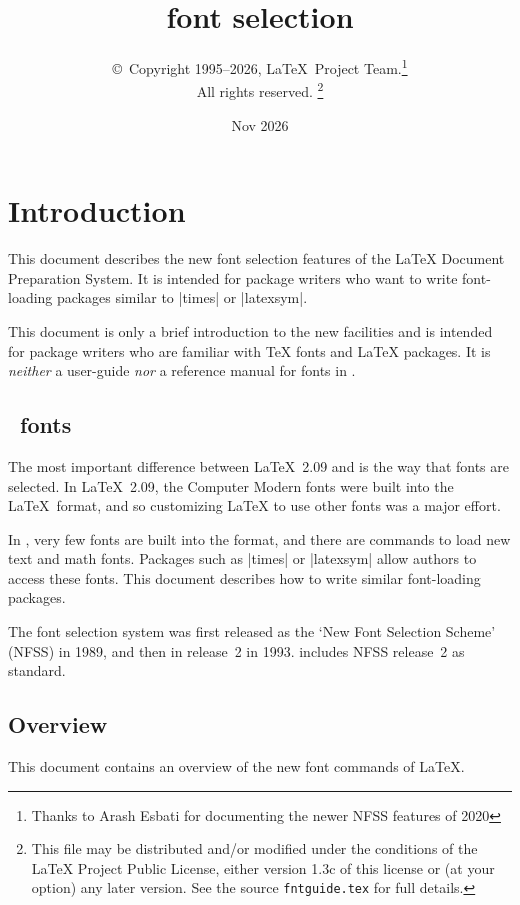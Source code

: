 \documentclass{ltxguide}[1995/11/28]
\title{\LaTeXe{} font selection}
\author{\copyright~Copyright 1995--2026, \LaTeX\ Project
  Team.\thanks{Thanks to Arash Esbati for documenting the
    newer NFSS features of 2020}\\
  All rights reserved.%
  \footnote{This file may be distributed and/or modified under the
    conditions of the \LaTeX{} Project Public License, either version 1.3c
    of this license or (at your option) any later version. See the source
   \texttt{fntguide.tex} for full details.}%
}
\date{Nov 2026}
\begin{document}
\maketitle

\tableofcontents

\section{Introduction}

This document describes the new font selection features of the \LaTeX{}
Document Preparation System.  It is intended for package writers who
want to write font-loading packages similar to |times| or |latexsym|.

This document is only a brief introduction to the new facilities and is
intended for package writers who are familiar with \TeX{} fonts and
\LaTeX{} packages.  It is \emph{neither} a user-guide \emph{nor} a
reference manual for fonts in \LaTeXe.

\subsection{\LaTeXe~fonts}

The most important difference between \LaTeX~2.09 and \LaTeXe{} is the
way that fonts are selected.  In \LaTeX~2.09, the Computer Modern fonts
were built into the \LaTeX~format, and so customizing \LaTeX{} to use
other fonts was a major effort.

In \LaTeXe, very few fonts are built into the format, and there are
commands to load new text and math fonts.  Packages such as |times| or
|latexsym| allow authors to access these fonts.  This document describes
how to write similar font-loading packages.

The \LaTeXe{} font selection system was first released as the `New Font
Selection Scheme' (NFSS) in 1989, and then in release~2 in 1993.
\LaTeXe{} includes NFSS release~2 as standard.

\subsection{Overview}

This document contains an overview of the new font commands of \LaTeX.
\end{document}
